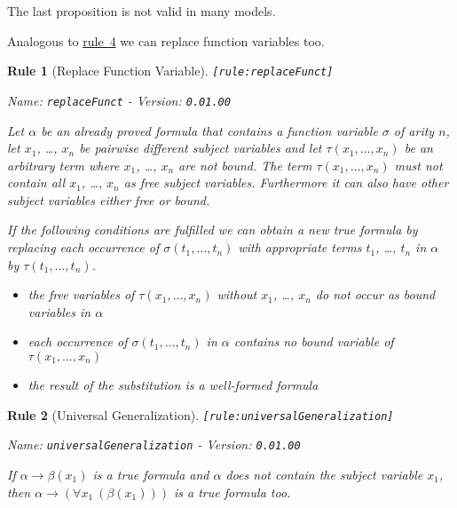 \documentclass[a4paper,german,10pt,twoside]{book}
\newtheorem{rul}{Rule}
\theoremstyle{definition}
\theoremstyle{remark}
\begin{document}
\par
The last proposition is not valid in many models.


\par
Analogous to \hyperlink{rule:replacePred}{rule~4} we can replace function variables too.

\begin{rul}[Replace Function Variable]
\label{rule:replaceFunct} \hypertarget{rule:replaceFunct}{}
{\tt \tiny [\verb]rule:replaceFunct]]}

\par
{\em   Name: \verb]replaceFunct]  -  Version: \verb]0.01.00]}


Let $\alpha$ be an already proved formula that contains a function variable $\sigma$ of arity $n$, let $x_1$, \ldots, $x_n$ be pairwise different subject variables and let $\tau(x_1, \ldots, x_n)$ be an arbitrary term where $x_1$, \ldots, $x_n$ are not bound. 
The term $\tau(x_1, \ldots, x_n)$ must not contain all $x_1$, \ldots, $x_n$ as free subject variables. Furthermore it can also have other subject variables either free or bound. 

If the following conditions are fulfilled we can obtain a new true formula by replacing each occurrence of $\sigma(t_1, \ldots, t_n)$ with appropriate terms $t_1$, \ldots, $t_n$ in $\alpha$ by $\tau(t_1, \ldots, t_n)$.

\begin{itemize}

\item 
the free variables of $\tau(x_1, \ldots, x_n)$ without $x_1$, \ldots, $x_n$ do not occur as bound variables in $\alpha$

\item
each occurrence of $\sigma(t_1, \ldots, t_n)$ in $\alpha$ contains no bound variable of $\tau(x_1, \ldots, x_n)$

\item
the result of the substitution is a well-formed formula
                  
\end{itemize}
\end{rul}


\begin{rul}[Universal Generalization]
\label{rule:universalGeneralization} \hypertarget{rule:universalGeneralization}{}
{\tt \tiny [\verb]rule:universalGeneralization]]}

\par
{\em   Name: \verb]universalGeneralization]  -  Version: \verb]0.01.00]}


If $\alpha \rightarrow \beta(x_1)$ is a true formula and $\alpha$ does not contain the subject variable $x_1$, then $\alpha \rightarrow (\forall x_1~(\beta(x_1)))$ is a true 
formula too.
\end{rul}
\end{document}
